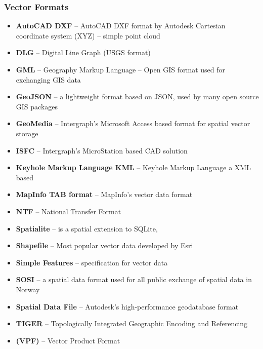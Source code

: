 \documentclass[12pt, letter]{article}
\begin{document}
\subsubsection{Vector Formats}

\begin{itemize}

 \item \textbf{AutoCAD DXF} – AutoCAD DXF format by Autodesk
       Cartesian coordinate system (XYZ) – simple point cloud
 \item \textbf{DLG} – Digital Line Graph (USGS format)
 \item \textbf{GML} – Geography Markup Language – Open GIS format used for exchanging GIS data
 \item \textbf{GeoJSON} – a lightweight format based on JSON, used by many open source GIS packages
 \item \textbf{GeoMedia} – Intergraph’s Microsoft Access based format for spatial vector storage
 \item \textbf{ISFC} – Intergraph’s MicroStation based CAD solution
 \item \textbf{Keyhole Markup Language KML} – Keyhole Markup Language a XML based
 \item \textbf{MapInfo TAB format} – MapInfo’s vector data format
 \item \textbf{NTF} – National Transfer Format
 \item \textbf{Spatialite} – is a spatial extension to SQLite,
 \item \textbf{Shapefile} – Most popular vector data developed by Esri
 \item \textbf{Simple Features} – specification for vector data
 \item \textbf{SOSI} – a spatial data format used for all public exchange of spatial data in Norway
 \item \textbf{Spatial Data File} – Autodesk’s high-performance geodatabase format
 \item \textbf{TIGER} – Topologically Integrated Geographic Encoding and Referencing
 \item \textbf{(VPF)} – Vector Product Format
\end{itemize}
\end{document}
